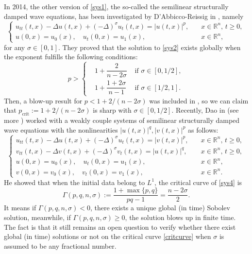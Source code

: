 \documentclass[11pt,reqno]{amsart}
\numberwithin{equation}{section}
\theoremstyle{plain}
\begin{document}
In 2014, the other version of \eqref{sys1}, the so-called the semilinear structurally damped wave equations, has been investigated by D'Abbicco-Reissig in \cite{AbbRei2014}, namely
\begin{equation}\label{sys2}
\begin{cases}
u_{tt}(t,x)-\Delta u(t,x) +(-\Delta)^{\sigma}u_t(t,x)=|u(t,x)|^p,\quad &x\in \mathbb{R}^n,\, t\geq 0, \\
u(0,x)=u_0(x),\quad u_t(0,x)=u_1(x), \quad &x\in \mathbb{R}^n,
\end{cases}
\end{equation}
for any $\sigma\in [0,1]$. They proved that the solution to \eqref{sys2} exists globally when the exponent fulfills the following conditions:
$$p>
\left\{
\begin{aligned}
    &1+\dfrac{2}{n-2\sigma} &\text{ if }\sigma\in[0,1/2], \\
    &1+\dfrac{1+2\sigma}{n-1} &\text{ if }\sigma\in[1/2,1].
\end{aligned}
\right.
$$
Then, a blow-up result for $p<1+2/(n-2\sigma)$ was included in \cite{Anhblowup}, so we can claim that $p_{\text{crit}}:=1+2/(n-2\sigma)$ is sharp with $\sigma\in[0,1/2]$. Recently, Dao in \cite{Dao} (see more \cite{Anh2020}) worked with a weakly couple systems of semilinear structurally damped wave equations with the nonlinearities $|u(t,x)|^{q}, |v(t,x)|^{p}$ as follows:
\begin{equation}\label{sys4}
\begin{cases}
u_{tt}(t,x) -\Delta u(t,x) +(-\Delta)^{\sigma}u_t(t,x)=|v(t,x)|^p,\quad &x\in \mathbb{R}^n,\, t\geq 0, \\
v_{tt}(t,x) -\Delta v(t,x) +(-\Delta)^{\sigma}v_t(t,x)=|u(t,x)|^q,\quad &x\in \mathbb{R}^n,\, t\geq 0,\\
u(0,x)=u_0(x), \quad u_t(0,x)=u_1(x), \quad &x\in \mathbb{R}^n,\\
v(0,x)=v_0(x), \quad v_t(0,x)=v_1(x), \quad &x\in \mathbb{R}^n.
\end{cases}
\end{equation}
He showed that when the initial data belong to $L^1$, the critical curve of \eqref{sys4} is
\begin{equation}\label{critcurve}
\Gamma(p,q,n,\sigma):= \frac{1+\max\{p,q\}}{pq-1}=\frac{n-2\sigma}{2}.
\end{equation}
It means if $\Gamma(p,q,n,\sigma)<0$, there exists a unique global (in time) Sobolev solution, meanwhile, if $\Gamma(p,q,n,\sigma)\ge 0$, the solution blows up in finite time. The fact is that it still remains an open question to verify whether there exist global (in time) solutions or not on the critical curve \eqref{critcurve} when $\sigma$ is assumed to be any fractional number.
\end{document}

